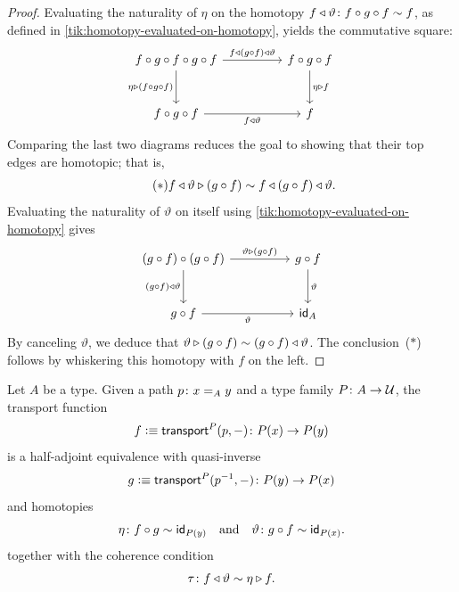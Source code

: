 \begin{proof}
    Evaluating the naturality of $\eta$ on the homotopy $f\lwct\vartheta\colon f\circ g\circ f\sim f$, as defined in \eqref{tik:homotopy-evaluated-on-homotopy}, yields the commutative square:
    \[
        \begin{tikzcd}[column sep=huge, row sep=large]
            f\circ g\circ f\circ g\circ f
                \arrow[r,"f\lwct(g\circ f)\lwct\vartheta"]
                \arrow[d,"\eta\rwct(f\circ g\circ f)"'] &
            f\circ g\circ f
                \arrow[d,"\eta\rwct f"] \\
            f\circ g\circ f
                \arrow[r,"f\lwct\vartheta"'] &
            f
        \end{tikzcd}
    \]
    Comparing the last two diagrams reduces the goal to showing that their top edges are homotopic; that is,
    \[\tag{$\ast$}
        f\triangleleft\vartheta\triangleright(g\circ f)
        \sim f\triangleleft(g\circ f)\triangleleft\vartheta.
    \]
    Evaluating the naturality of $\vartheta$ on itself using \eqref{tik:homotopy-evaluated-on-homotopy} gives
    \[
        \begin{tikzcd}[column sep=huge,row sep=large]
            (g\circ f)\circ(g\circ f)
                \arrow[r,"\vartheta\rwct(g\circ f)"]
                \arrow[d,"(g\circ f)\lwct\vartheta"'] &
            g\circ f
                \arrow[d,"\vartheta"] \\
            g\circ f
                \arrow[r,"\vartheta"']
                &\id_A
        \end{tikzcd}
    \]
    By canceling $\vartheta$, we deduce that $\vartheta\triangleright(g\circ f)\sim(g\circ f)\triangleleft\vartheta$. The conclusion~($\ast$) follows by whiskering this homotopy with $f$ on the left.
\end{proof}


\begin{thm} {}
    \label{thm:coherent-transport}
    Let\/ $A$ be a type. Given a path\/ $p\colon x\eq Ay$ and a type family\/ $P\colon A\to\univ$, the transport function
    \[
        f\defeq\fun{transport}^P(p,\dummy)\colon P(x)\to P(y)
    \]
    is a half-adjoint equivalence with quasi-inverse
    \[
        g\defeq\fun{transport}^P(p^{-1},\dummy)\colon P(y)\to P(x)
    \]
    and homotopies
    \[
        \eta\colon f\circ g\sim\id_{P(y)}
        \quad\text{and\/}\quad
        \vartheta\colon g\circ f\sim\id_{P(x)}.
    \]
    together with the coherence condition
    \[
        \tau\colon f\lwct\vartheta\sim\eta\rwct f.
    \]
\end{thm}

